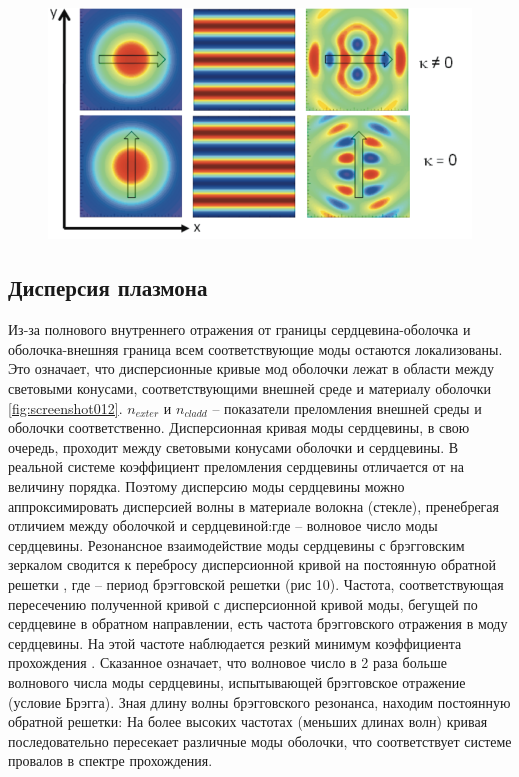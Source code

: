 \begin{figure}[h]
	\centering
	\includegraphics[width=0.7\linewidth]{screenshot008}
	\caption{}
	\label{fig:screenshot008}
\end{figure}

\subsection{Дисперсия плазмона}
Из-за полнового внутреннего отражения от границы сердцевина-оболочка и оболочка-внешняя граница всем соответствующие моды остаются локализованы. Это означает, что дисперсионные кривые мод оболочки лежат в области между световыми конусами, соответствующими внешней среде и материалу оболочки \ref{fig:screenshot012}. $ n_{exter} $ и $ n_{cladd} $  – показатели преломления внешней среды и оболочки соответственно. Дисперсионная кривая моды сердцевины, в свою очередь, проходит между световыми конусами оболочки и сердцевины. В реальной системе коэффициент преломления сердцевины   отличается от   на величину порядка. Поэтому дисперсию моды сердцевины можно аппроксимировать дисперсией волны в материале волокна (стекле), пренебрегая отличием между оболочкой и сердцевиной:где   – волновое число моды сердцевины.
Резонансное взаимодействие моды сердцевины с брэгговским зеркалом сводится к перебросу дисперсионной кривой на постоянную обратной решетки  , где   – период брэгговской решетки (рис 10). Частота, соответствующая пересечению полученной кривой с дисперсионной кривой моды, бегущей по сердцевине в обратном направлении, есть частота брэгговского отражения в моду сердцевины. На этой частоте наблюдается резкий минимум коэффициента прохождения . Сказанное означает, что волновое число   в 2 раза больше волнового числа моды сердцевины, испытывающей брэгговское отражение (условие Брэгга). Зная длину волны брэгговского резонанса, находим постоянную обратной решетки:
На более высоких частотах (меньших длинах волн) кривая последовательно пересекает различные моды оболочки, что соответствует системе провалов в спектре прохождения.



